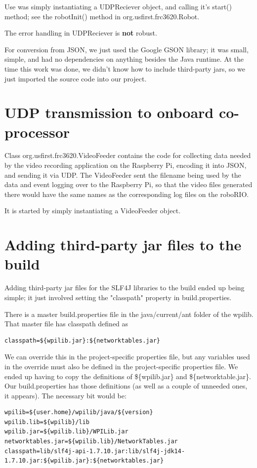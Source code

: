 \documentclass[]{article}
\begin{document}
Use was simply instantiating a UDPReciever object, and calling it's start() method; see the robotInit() method in org.usfirst.frc3620.Robot.

The error handling in UDPReciever is \textbf{not} robust.

For conversion from JSON, we just used the Google GSON library; it was small, simple, and had no dependencies on anything besides the Java runtime.
At the time this work was done, we didn't know how to include third-party jars, so we just imported the source code into our project. 

\section {UDP transmission to onboard co-processor}

Class org.usfirst.frc3620.VideoFeeder contains the code for collecting data needed by the video recording application on the Raspberry Pi, encoding it into JSON, and sending it via UDP.
The VideoFeeder sent the filename being used by the data and event logging over to the Raspberry Pi, so that the video files generated there would have the same names as the corresponding log files on the roboRIO.

It is started by simply instantiating a VideoFeeder object.

\section {Adding third-party jar files to the build}

Adding third-party jar files for the SLF4J libraries to the build ended up being simple; it just involved setting the "classpath" property in build.properties.

There is a master build.properties file in the java/current/ant folder of the wpilib.
That master file has classpath defined as
\begin{lstlisting}[frame=single]
classpath=${wpilib.jar}:${networktables.jar}
\end{lstlisting}

We can override this in the project-specific properties file, but any variables used in the override must also be defined in the project-specific properties file.
We ended up having to copy the definitions of \$\{wpilib.jar\} and \$\{networktable.jar\}. Our build.properties has those definitions (as well as a couple of unneeded ones, it appears). The necessary bit would be:
\begin{lstlisting}[frame=single]
wpilib=${user.home}/wpilib/java/${version}
wpilib.lib=${wpilib}/lib
wpilib.jar=${wpilib.lib}/WPILib.jar
networktables.jar=${wpilib.lib}/NetworkTables.jar
classpath=lib/slf4j-api-1.7.10.jar:lib/slf4j-jdk14-1.7.10.jar:${wpilib.jar}:${networktables.jar}
\end{lstlisting}
\end{document}
